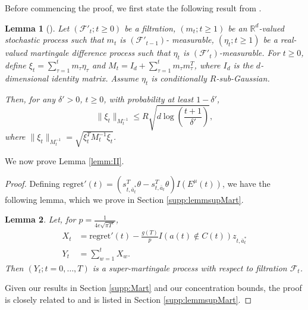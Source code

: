 \documentclass{article}
\newtheorem{lemma}{Lemma}
\begin{document}
\begin{appendices}
Before commencing the proof, we first state the following result from \cite{abbasi2011improved}.
\begin{lemma}[\cite{abbasi2011improved}]
\label{lemm:AbbYad}
Let $(\mathcal{F}'_t; t\geq 0)$ be a filtration, $(m_t;t\geq 1)$ be an $\mathbb{R}^d$-valued stochastic process such that $m_t$ is $(\mathcal{F}'_{t-1})$- measurable, $(\eta_t ; t\geq 1)$ be a real-valued martingale difference process such that $\eta_t$ is $(\mathcal{F}'_t)$-measurable. For $t \geq 0$, define $\xi_t = \sum_{\tau = 1}^t m_\tau \eta_\tau$ and $M_t = I_d + \sum_{\tau = 1}^t m_{\tau} m_{\tau}^T$, where $I_d$ is the $d$-dimensional identity matrix. Assume $\eta_t$ is conditionally $R$-sub-Gaussian. 

Then, for any $\delta' > 0$, $t \geq 0$, with probability at least $1 - \delta'$, 
\[
\|\xi_t \|_{M_t^{-1}} \leq R\sqrt{d \log \left(\frac{t+1}{\delta'}\right)},
\]
where $\|\xi_t \|_{M_t^{-1}} = \sqrt{\xi_t^T M_t^{-1} \xi_t}$.
\end{lemma}



We now prove Lemma \ref{lemm:II}.
\begin{proof}

Defining $\mathrm{regret}'(t) = (s_{t,\bar{a}^*_t}^T \theta - s_{t,\bar{a}_t}^T \theta)I(E^\mu(t))$, 
we have the following lemma, which we prove in Section \ref{supp:lemmsupMart}.
\begin{lemma}\label{lemm:supMart}
Let, for $p = \frac{1}{4e \sqrt{\pi T^\epsilon}}$,
\begin{align}
X_t &= \mathrm{regret}'(t) - \frac{g(T)}{p} I(a(t) \notin C(t)) z_{t,\bar{a}^*_t}\\
Y_t &= \sum_{w = 1}^t X_w.
\end{align}
Then $(Y_t; t = 0,\dots, T)$ is a super-martingale process with respect to filtration $\mathcal{F}_t$. %
\end{lemma}
Given our results in Section \ref{supp:Mart} and our concentration bounds, the proof is closely related to \cite{agrawal2013thompson} and is listed in Section \ref{supp:lemmsupMart}. 





\end{proof}
\end{appendices}
\end{document}
